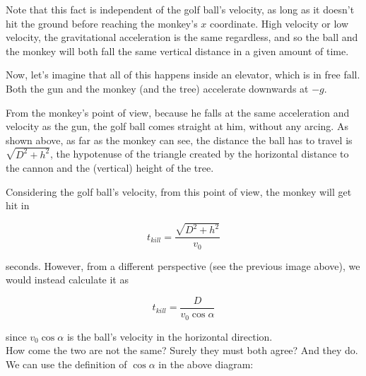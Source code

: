 Note that this fact is independent of the golf ball's velocity, as long as it doesn't hit the ground before reaching the monkey's $x$ coordinate. High velocity or low velocity, the gravitational acceleration is the same regardless, and so the ball and the monkey will both fall the same vertical distance in a given amount of time.

Now, let's imagine that all of this happens inside an elevator, which is in free fall. Both the gun and the monkey (and the tree) accelerate downwards at $-g$.

\begin{figure}[H]
  \centering
{}
\end{figure}

From the monkey's point of view, because he falls at the same acceleration and velocity as the gun, the golf ball comes straight at him, without any arcing. As shown above, as far as the monkey can see, the distance the ball has to travel is $\sqrt{D^2 + h^2}$, the hypotenuse of the triangle created by the horizontal distance to the cannon and the (vertical) height of the tree.

Considering the golf ball's velocity, from this point of view, the monkey will get hit in

\begin{equation}
t_{kill} = \frac{\sqrt{D^2 + h^2}}{v_0}
\end{equation}

seconds. However, from a different perspective (see the previous image above), we would instead calculate it as

\begin{equation}
t_{kill} = \frac{D}{v_0 \cos \alpha}
\end{equation}

since $v_0 \cos \alpha$ is the ball's velocity in the horizontal direction.\\
How come the two are not the same? Surely they must both agree? And they do. We can use the definition of $\cos \alpha$ in the above diagram:

